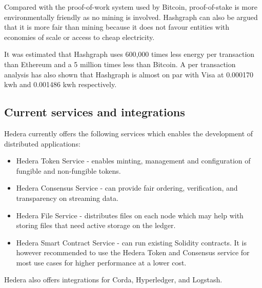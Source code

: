 Compared with the proof-of-work system used by Bitcoin, proof-of-stake is more environmentally friendly as no mining is involved. Hashgraph can also be argued that it is more fair than mining because it does not favour entities with economies of scale or access to cheap electricity.

It was estimated that Hashgraph uses 600,000 times less energy per transaction than Ethereum and a 5 million times less than Bitcoin\cite{jiro2021power}. A per transaction analysis has also shown that Hashgraph is almost on par with Visa at 0.000170 kwh and 0.001486 kwh respectively.




\subsection{Current services and integrations}

Hedera currently offers the following services\cite{hederaservices} which enables the development of distributed applications:

\begin{itemize}
    \item Hedera Token Service - enables minting, management and configuration of fungible and non-fungible tokens.
    \item Hedera Consensus Service - can provide fair ordering, verification, and transparency on streaming data.
    \item Hedera File Service - distributes files on each node which may help with storing files that need active storage on the ledger. 
    \item Hedera Smart Contract Service - can run existing Solidity contracts. It is however recommended to use the Hedera Token and Consensus service for most use cases for higher performance at a lower cost.
\end{itemize}



Hedera also offers integrations\cite{hederaintegrations} for Corda, Hyperledger, and Logstash.

